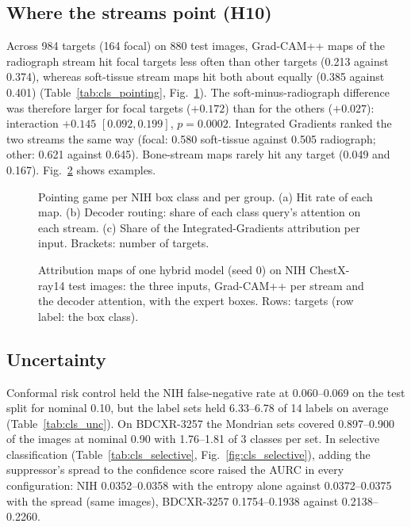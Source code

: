 \subsection{Where the streams point (H10)}
Across 984 targets (164 focal) on 880 test images, Grad-CAM++ maps of the radiograph stream hit focal targets less often than other targets
(0.213 against 0.374), whereas soft-tissue stream maps hit both about equally (0.385 against 0.401) (Table~\ref{tab:cls_pointing},
Fig.~\ref{fig:cls_pointing}). The soft-minus-radiograph difference was therefore larger for focal targets ($+0.172$) than for the others
($+0.027$): interaction $+0.145$ $[0.092,0.199]$, $p=0.0002$. Integrated Gradients ranked the two streams the same way (focal: 0.580
soft-tissue against 0.505 radiograph; other: 0.621 against 0.645). Bone-stream maps rarely hit any target (0.049 and 0.167).
Fig.~\ref{fig:cls_maps} shows examples.

\begin{table}[htbp]
\centering\footnotesize
\caption{H10: pointing-game hit rates on the NIH expert boxes, means over targets of the per-target means over the five hybrid models;
tolerance 15\,px at 256\,px. Last row: soft-tissue minus radiograph stream (Grad-CAM++) and the interaction with its 95\,\% image-cluster
bootstrap interval.}
\label{tab:cls_pointing}
\end{table}

\begin{figure}[htbp]
\centering
{}
\caption{Pointing game per NIH box class and per group. (a) Hit rate of each map. (b) Decoder routing: share of each class query's
attention on each stream. (c) Share of the Integrated-Gradients attribution per input. Brackets: number of targets.}
\label{fig:cls_pointing}
\end{figure}

\begin{figure}[htbp]
\centering
{}
\caption{Attribution maps of one hybrid model (seed 0) on NIH ChestX-ray14 test images: the three inputs, Grad-CAM++ per stream and the
decoder attention, with the expert boxes. Rows: targets (row label: the box class).}
\label{fig:cls_maps}
\end{figure}

\subsection{Uncertainty}
Conformal risk control held the NIH false-negative rate at 0.060--0.069 on the test split for nominal 0.10, but the label sets held 6.33--6.78
of 14 labels on average (Table~\ref{tab:cls_unc}). On BDCXR-3257 the Mondrian sets covered 0.897--0.900 of the images at nominal 0.90 with
1.76--1.81 of 3 classes per set. In selective classification (Table~\ref{tab:cls_selective}, Fig.~\ref{fig:cls_selective}), adding the
suppressor's spread to the confidence score raised the AURC in every configuration: NIH 0.0352--0.0358 with the entropy alone against
0.0372--0.0375 with the spread (same images), BDCXR-3257 0.1754--0.1938 against 0.2138--0.2260.

